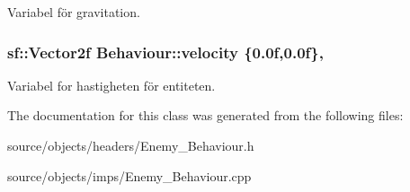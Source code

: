 Variabel för gravitation. 

\hypertarget{classBehaviour_a1d52096cf20a59890f7705acbaccf88a}{
\subsubsection[{velocity}]{\setlength{\rightskip}{0pt plus 5cm}sf\+::\+Vector2f Behaviour\+::velocity \{0.\+0f,0.\+0f\}\hspace{0.3cm}{\ttfamily [protected]}, {\ttfamily [inherited]}}}\label{classBehaviour_a1d52096cf20a59890f7705acbaccf88a}


Variabel for hastigheten för entiteten. 



The documentation for this class was generated from the following files\+:\begin{DoxyCompactItemize}
\item 
source/objects/headers/Enemy\+\_\+\+Behaviour.\+h\item 
source/objects/imps/Enemy\+\_\+\+Behaviour.\+cpp\end{DoxyCompactItemize}
